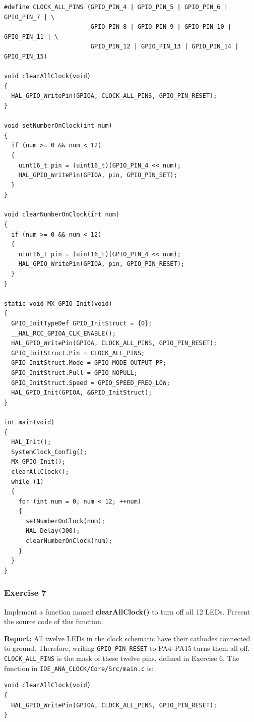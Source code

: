 \begin{lstlisting}[basicstyle=\ttfamily\small,caption={Exercise 6: GPIO initialization and sequential test of the 12 clock LEDs}]
#define CLOCK_ALL_PINS (GPIO_PIN_4 | GPIO_PIN_5 | GPIO_PIN_6 | GPIO_PIN_7 | \
                        GPIO_PIN_8 | GPIO_PIN_9 | GPIO_PIN_10 | GPIO_PIN_11 | \
                        GPIO_PIN_12 | GPIO_PIN_13 | GPIO_PIN_14 | GPIO_PIN_15)

void clearAllClock(void)
{
  HAL_GPIO_WritePin(GPIOA, CLOCK_ALL_PINS, GPIO_PIN_RESET);
}

void setNumberOnClock(int num)
{
  if (num >= 0 && num < 12)
  {
    uint16_t pin = (uint16_t)(GPIO_PIN_4 << num);
    HAL_GPIO_WritePin(GPIOA, pin, GPIO_PIN_SET);
  }
}

void clearNumberOnClock(int num)
{
  if (num >= 0 && num < 12)
  {
    uint16_t pin = (uint16_t)(GPIO_PIN_4 << num);
    HAL_GPIO_WritePin(GPIOA, pin, GPIO_PIN_RESET);
  }
}

static void MX_GPIO_Init(void)
{
  GPIO_InitTypeDef GPIO_InitStruct = {0};
  __HAL_RCC_GPIOA_CLK_ENABLE();
  HAL_GPIO_WritePin(GPIOA, CLOCK_ALL_PINS, GPIO_PIN_RESET);
  GPIO_InitStruct.Pin = CLOCK_ALL_PINS;
  GPIO_InitStruct.Mode = GPIO_MODE_OUTPUT_PP;
  GPIO_InitStruct.Pull = GPIO_NOPULL;
  GPIO_InitStruct.Speed = GPIO_SPEED_FREQ_LOW;
  HAL_GPIO_Init(GPIOA, &GPIO_InitStruct);
}

int main(void)
{
  HAL_Init();
  SystemClock_Config();
  MX_GPIO_Init();
  clearAllClock();
  while (1)
  {
    for (int num = 0; num < 12; ++num)
    {
      setNumberOnClock(num);
      HAL_Delay(300);
      clearNumberOnClock(num);
    }
  }
}
\end{lstlisting}

\subsubsection{Exercise 7}
Implement a function named \textbf{clearAllClock()} to turn off all 12 LEDs. Present the source code of this function.

\textbf{Report: } All twelve LEDs in the clock schematic have their cathodes connected to ground. Therefore, writing \texttt{GPIO\_PIN\_RESET} to PA4--PA15 turns them all off. \texttt{CLOCK\_ALL\_PINS} is the mask of these twelve pins, defined in Exercise 6. The function in \texttt{IDE\_ANA\_CLOCK/Core/Src/main.c} is:

\begin{lstlisting}[caption={Exercise 7: turn off all 12 clock LEDs}]
void clearAllClock(void)
{
  HAL_GPIO_WritePin(GPIOA, CLOCK_ALL_PINS, GPIO_PIN_RESET);
}
\end{lstlisting}


